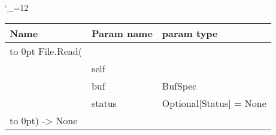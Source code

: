\begingroup \catcode`\_=12 \tt
\begin{tabular}{lll}
\toprule
\textrm{Name}&\textrm{Param name}&\textrm{param type}\\
\midrule
\hbox to 0pt {File.Read(\hss}\\
& self\\
& buf & BufSpec\\
& status & Optional[Status] = None\\
\hbox to 0pt{) -> None\hss}\\
\bottomrule
\end{tabular}
\endgroup
